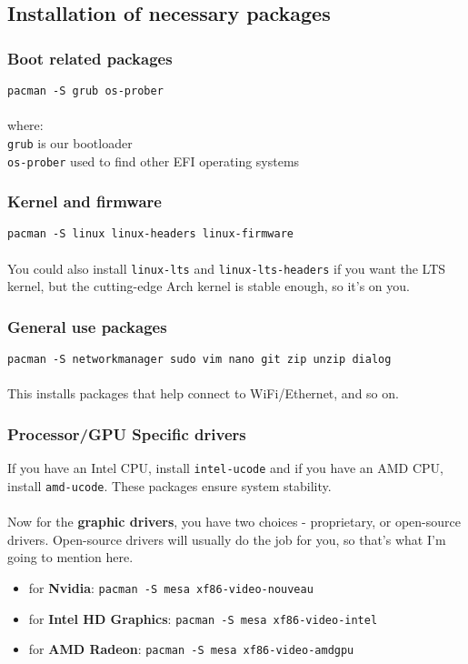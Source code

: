 \documentclass{article}
\begin{document}
\subsection{Installation of necessary packages}
\subsubsection{Boot related packages}
\texttt{pacman -S grub os-prober}
\\\\
where:\\
\texttt{grub} is our bootloader\\
\texttt{os-prober} used to find other EFI operating systems

\subsubsection{Kernel and firmware}
\texttt{pacman -S linux linux-headers linux-firmware}\\\\
You could also install \texttt{linux-lts} and \texttt{linux-lts-headers} if you want the LTS kernel, but the cutting-edge Arch kernel is stable enough, so it's on you.

\subsubsection{General use packages}
\texttt{pacman -S networkmanager sudo vim nano git zip unzip dialog}\\\\
This installs packages that help connect to WiFi/Ethernet, and so on. 
\subsubsection{Processor/GPU Specific drivers}
If you have an Intel CPU, install \texttt{intel-ucode} and if you have an AMD CPU, install \texttt{amd-ucode}. These packages ensure system stability.\\\\Now for the \textbf{graphic drivers}, you have two choices - proprietary, or open-source drivers. Open-source drivers will usually do the job for you, so that's what I'm going to mention here.

\begin{itemize}
  \item for \textbf{Nvidia}: \texttt{pacman -S mesa xf86-video-nouveau}
  \item for \textbf{Intel HD Graphics}: \texttt{pacman -S mesa xf86-video-intel}

  \item for \textbf{AMD Radeon}: \texttt{pacman -S mesa xf86-video-amdgpu}
\end{itemize}
\end{document}
